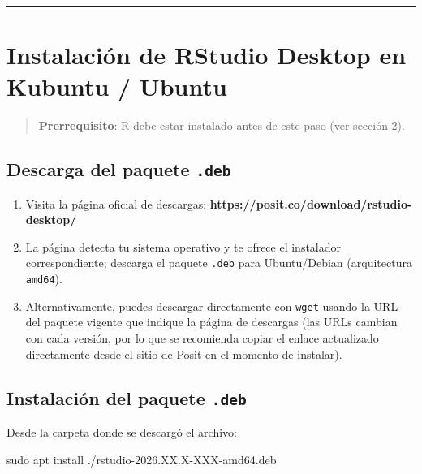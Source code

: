 \documentclass[
  man,
  floatsintext,
  longtable,
  a4paper,
  nolmodern,
  notxfonts,
  notimes,
  12pt,
  colorlinks=true,linkcolor=blue,citecolor=blue,urlcolor=blue]{apa7}
\newenvironment{Shaded}{\begin{snugshade}}{\end{snugshade}}
\newcommand{\FunctionTok}[1]{\textcolor[rgb]{0.28,0.35,0.67}{#1}}
\newcommand{\NormalTok}[1]{\textcolor[rgb]{0.00,0.23,0.31}{#1}}
\providecommand{\tightlist}{%
  \setlength{\itemsep}{0pt}\setlength{\parskip}{0pt}}
\begin{document}
\begin{center}\rule{0.5\linewidth}{0.5pt}\end{center}

\section{Instalación de RStudio Desktop en Kubuntu /
Ubuntu}\label{instalaciuxf3n-de-rstudio-desktop-en-kubuntu-ubuntu}

\begin{quote}
\textbf{Prerrequisito}: R debe estar instalado antes de este paso (ver
sección 2).
\end{quote}

\subsection{\texorpdfstring{Descarga del paquete
\texttt{.deb}}{Descarga del paquete .deb}}\label{descarga-del-paquete-.deb}

\begin{enumerate}
\def\labelenumi{\arabic{enumi}.}
\tightlist
\item
  Visita la página oficial de descargas:
  \textbf{https://posit.co/download/rstudio-desktop/}
\item
  La página detecta tu sistema operativo y te ofrece el instalador
  correspondiente; descarga el paquete \texttt{.deb} para Ubuntu/Debian
  (arquitectura \texttt{amd64}).
\item
  Alternativamente, puedes descargar directamente con \texttt{wget}
  usando la URL del paquete vigente que indique la página de descargas
  (las URLs cambian con cada versión, por lo que se recomienda copiar el
  enlace actualizado directamente desde el sitio de Posit en el momento
  de instalar).
\end{enumerate}

\subsection{\texorpdfstring{Instalación del paquete
\texttt{.deb}}{Instalación del paquete .deb}}\label{instalaciuxf3n-del-paquete-.deb}

Desde la carpeta donde se descargó el archivo:

\begin{Shaded}
\begin{Highlighting}[]
\FunctionTok{sudo}\NormalTok{ apt install ./rstudio{-}2026.XX.X{-}XXX{-}amd64.deb}
\end{Highlighting}
\end{Shaded}
\end{document}

